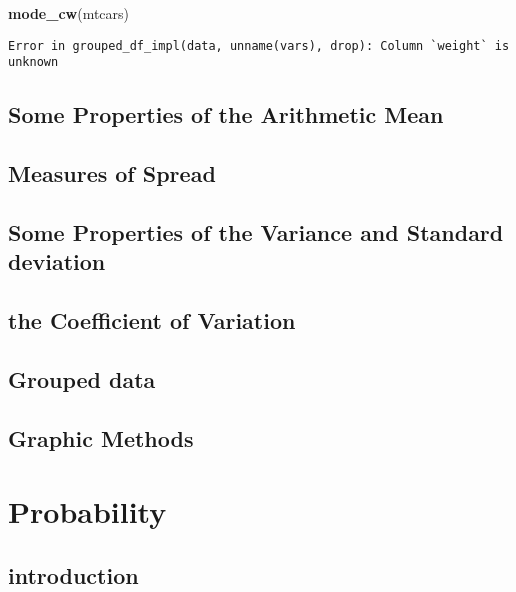 \documentclass[12pt,]{article}
\newenvironment{Shaded}{\begin{snugshade}}{\end{snugshade}}
\newcommand{\KeywordTok}[1]{\textcolor[rgb]{0.13,0.29,0.53}{\textbf{#1}}}
\newcommand{\NormalTok}[1]{#1}
\theoremstyle{definition}
\theoremstyle{definition}
\theoremstyle{definition}
\theoremstyle{remark}
\begin{document}
\begin{Shaded}
\begin{Highlighting}[]
\KeywordTok{mode_cw}\NormalTok{(mtcars)}
\end{Highlighting}
\end{Shaded}

\begin{verbatim}
Error in grouped_df_impl(data, unname(vars), drop): Column `weight` is unknown
\end{verbatim}

\subsection{Some Properties of the Arithmetic
Mean}\label{some-properties-of-the-arithmetic-mean}

\subsection{Measures of Spread}\label{measures-of-spread}

\subsection{Some Properties of the Variance and Standard
deviation}\label{some-properties-of-the-variance-and-standard-deviation}

\subsection{the Coefficient of
Variation}\label{the-coefficient-of-variation}

\subsection{Grouped data}\label{grouped-data}

\subsection{Graphic Methods}\label{graphic-methods}

\section{Probability}\label{probability}

\subsection{introduction}\label{introduction-1}
\end{document}
